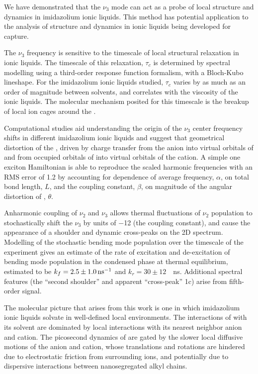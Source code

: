 \documentclass[%
  class = book,%
  crop = false,%
  float = true,%
  multi = true,%
  preview = false,%
]{standalone}
\begin{document}
{We have demonstrated that the  \(\nu_3\) mode can act as a probe of local structure and dynamics in imidazolium ionic liquids. This method has potential application to the analysis of structure and dynamics in ionic liquids being developed for  capture.

The \(\nu_3\) frequency is sensitive to the timescale of local structural relaxation in ionic liquids. The timescale of this relaxation, \(\tau_c\) is determined by spectral modelling using a third-order response function formalism, with a Bloch-Kubo lineshape. For the imidazolium ionic liquids studied, \(\tau_c\) varies by as much as an order of magnitude between solvents, and correlates with the viscosity of the ionic liquids. The molecular mechanism posited for this timescale is the breakup of local ion cages around the .

Computational studies aid understanding the origin of the \(\nu_3\) center frequency shifts in different imidazolium ionic liquids and suggest that geometrical distortion of the , driven by charge transfer from the anion into virtual orbitals of  and from occupied orbitals of  into virtual orbitals of the cation. A simple one exciton Hamiltonian is able to reproduce the scaled harmonic frequencies with an RMS error of \SI{1.2}{\wavenumber} by accounting for dependence of average frequency, \(\alpha\), on total bond length, \(L\), and the coupling constant, \(\beta\), on magnitude of the angular distortion of , \(\theta\).

Anharmonic coupling of \(\nu_2\) and \(\nu_3\) allows thermal fluctuations of \(\nu_2\) population to stochastically shift the  \(\nu_3\) by units of \SI{-12}{\wavenumber} (the coupling constant), and cause the appearance of a shoulder and dynamic cross-peaks on the 2D spectrum. Modelling of the stochastic bending mode population over the timescale of the experiment gives an estimate of the rate of excitation and de-excitation of bending mode population in the condensed phase at thermal equilibrium, estimated to be \(k_{f} = \SI{2.5 \pm 1}{\per\ns}\) and $k_r = 30\pm12$~\si{\per\ns}. Additional spectral features (the ``second shoulder'' and apparent ``cross-peak'' 1c) arise from fifth-order signal.

The molecular picture that arises from this work is one in which imidazolium ionic liquids solvate  in well-defined local environments. The interactions of  with its solvent are dominated by local interactions with its nearest neighbor anion and cation. The picosecond dynamics of  are gated by the slower local diffusive motions of the anion and cation, whose translations and rotations are hindered due to electrostatic friction from surrounding ions, and potentially due to dispersive interactions between nanosegregated alkyl chains.

}
\end{document}
